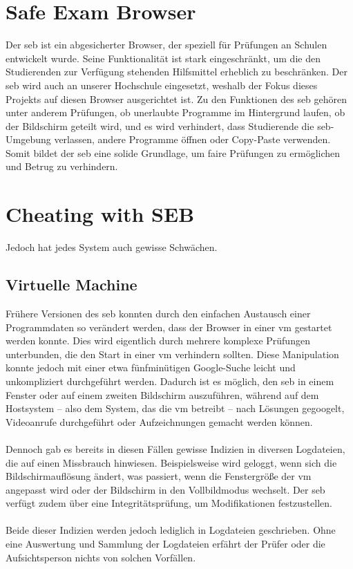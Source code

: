 \section{Safe Exam Browser}
Der \gls{seb} ist ein abgesicherter Browser, der speziell für Prüfungen an Schulen entwickelt wurde. 
Seine Funktionalität ist stark eingeschränkt, um die den Studierenden zur Verfügung stehenden Hilfsmittel erheblich zu beschränken.
Der \gls{seb} wird auch an unserer Hochschule eingesetzt, weshalb der Fokus dieses Projekts auf diesen Browser ausgerichtet ist. 
Zu den Funktionen des \gls{seb} gehören unter anderem Prüfungen, ob unerlaubte Programme im Hintergrund laufen, ob der Bildschirm geteilt wird, und es wird verhindert, dass Studierende die \gls{seb}-Umgebung verlassen, andere Programme öffnen oder Copy-Paste verwenden. 
Somit bildet der \gls{seb} eine solide Grundlage, um faire Prüfungen zu ermöglichen und Betrug zu verhindern.
\section{Cheating with SEB}
Jedoch hat jedes System auch gewisse Schwächen.

\subsection{Virtuelle Machine}
Frühere Versionen des \gls{seb} konnten durch den einfachen Austausch einer Programmdaten so verändert werden, dass der Browser in einer \gls{vm} gestartet werden konnte. 
Dies wird eigentlich durch mehrere komplexe Prüfungen unterbunden, die den Start in einer \gls{vm} verhindern sollten. 
Diese Manipulation konnte jedoch mit einer etwa fünfminütigen Google-Suche leicht und unkompliziert durchgeführt werden. 
Dadurch ist es möglich, den \gls{seb} in einem Fenster oder auf einem zweiten Bildschirm auszuführen, während auf dem Hostsystem – also dem System, das die \gls{vm} betreibt – nach Lösungen gegoogelt, Videoanrufe durchgeführt oder Aufzeichnungen gemacht werden können.\\
\\
Dennoch gab es bereits in diesen Fällen gewisse Indizien in diversen Logdateien, die auf einen Missbrauch hinwiesen. 
Beispielsweise wird geloggt, wenn sich die Bildschirmauflösung ändert, was passiert, wenn die Fenstergröße der \gls{vm} angepasst wird oder der Bildschirm in den Vollbildmodus wechselt. 
Der \gls{seb} verfügt zudem über eine Integritätsprüfung, um Modifikationen festzustellen.\\
\\
Beide dieser Indizien werden jedoch lediglich in Logdateien geschrieben. 
Ohne eine Auswertung und Sammlung der Logdateien erfährt der Prüfer oder die Aufsichtsperson nichts von solchen Vorfällen.
